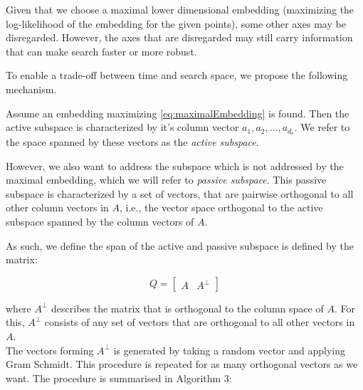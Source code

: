 Given that we choose a maximal lower dimensional embedding (maximizing the log-likelihood of the embedding for the given points), some other axes may be disregarded.
However, the axes that are disregarded may still carry information that can make search faster or more robust.

To enable a trade-off between time and search space, we propose the following mechanism.


Assume an embedding maximizing \ref{eq:maximalEmbedding} is found.
Then the active subspace is characterized by it's column vector $  a_1, a_2, ..., a_{d_e} $.
We refer to the space spanned by these vectors as the \textit{active subspace}.

However, we also want to address the subspace which is not addressed by the maximal embedding, which we will refer to \textit{passive subspace}.
This passive subspace is characterized by a set of vectors, that are pairwise orthogonal to all other column vectors in $A$, i.e., the vector space orthogonal to the active subspace spanned by the column vectors of $A$.

As such, we define the span of the active and passive subspace is defined by the matrix:

\begin{equation}
Q = 
\begin{bmatrix}
A & A^\bot
\end{bmatrix}
\label{eq:entireSubspace}
\end{equation}

where $A^\bot$ describes the matrix that is orthogonal to the column space of $A$.
For this, $A^\bot$ consists of any set of vectors that are orthogonal to all other vectors in $A$.\\

The vectors forming $A^\bot$  is generated by taking a random vector and applying Gram Schmidt.
This procedure is repeated for as many orthogonal vectors as we want. 
The procedure is summarised in Algorithm 3:\\

